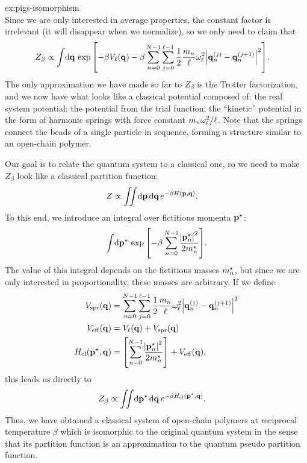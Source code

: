 \begin{DefAnswer}{ex:pigs-isomorphism}
\begin{subequations}
\end{subequations}
	Since we are only interested in average properties, the constant factor is irrelevant (it will disappear when we normalize), so we only need to claim that
	\begin{align}
		Z_\beta
		&\propto
			\int\! \dif \vec{q} \,
				\expb{
					-\beta V_\links(\vec{q})
					- \beta \sum_{n=0}^{N-1} \sum_{j=0}^{\links - 1}
						\frac{1}{2} \frac{m_n}{\links} \omega_\links^2 \abs{\vec{q}_n\bead{j} - \vec{q}_n\bead{j+1}}^2
				}.
	\end{align}
	The only approximation we have made so far to $Z_\beta$ is the Trotter factorization, and we now have what looks like a classical potential composed of: the real system potential; the potential from the trial function; the ``kinetic'' potential in the form of harmonic springs with force constant $m_n \omega_\ell^2 / \ell$.
	Note that the springs connect the beads of a single particle in sequence, forming a structure similar to an open-chain polymer.

	Our goal is to relate the quantum system to a classical one, so we need to make $Z_\beta$ look like a classical partition function:
	\begin{align}
		Z
		&\propto \iint\! \dif \vec{p} \dif \vec{q} \, e^{-\beta H(\vec{p}, \vec{q})}.
	\end{align}
	To this end, we introduce an integral over fictitious momenta ${\bm{\mathbf{p}}}^\star$:
	\begin{align}
		\int\! \dif \fict{\vec{p}} \, \expb{-\beta \sum_{n=0}^{N-1} \frac{\abs{\fict{\vec{p}}_n}^2}{2 \fict{m}_n}}.
	\end{align}
	The value of this integral depends on the fictitious masses ${m}^\star_n$, but since we are only interested in proportionality, these masses are arbitrary.
	If we define
	\begin{subequations} \label{eq:classical-equations}
	\begin{align}
		V_\mathrm{spr}(\bm{\mathbf{q}})
		&= \sum_{n=0}^{N-1} \sum_{j=0}^{\ell - 1}
			\frac{1}{2} \frac{m_n}{\ell} \omega_\ell^2
			\abs{\bm{\mathbf{q}}_n^{(j)} - \bm{\mathbf{q}}_n^{(j+1)}}^2
				\label{eq:classical-potential-spring} \\
		V_\mathrm{eff}(\bm{\mathbf{q}})
		&= V_\ell(\bm{\mathbf{q}}) + V_\mathrm{spr}(\bm{\mathbf{q}})
				\label{eq:classical-potential} \\
		H_\mathrm{cl}({\bm{\mathbf{p}}}^\star, \bm{\mathbf{q}})
		&= \left[ \sum_{n=0}^{N-1} \frac{\abs{{\bm{\mathbf{p}}}^\star_n}^2}{2 {m}^\star_n} \right] + V_\mathrm{eff}(\bm{\mathbf{q}}),
				\label{eq:classical-hamiltonian}
	\end{align}
	\end{subequations}
	this leads us directly to
	\begin{align}
		Z_\beta
		&\propto \iint\! \dif \fict{\vec{p}} \dif \vec{q} \, e^{-\beta \Hcl(\fict{\vec{p}}, \vec{q})}.
			\label{eq:classical-Z}
	\end{align}
	Thus, we have obtained a classical system of open-chain polymers at reciprocal temperature $\beta$ which is isomorphic to the original quantum system in the sense that its partition function is an approximation to the quantum pseudo partition function.


\end{DefAnswer}
